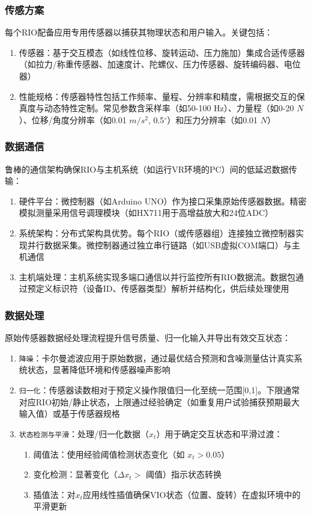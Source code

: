\documentclass[runningheads]{llncs}
\begin{document}
\subsubsection{传感方案}
每个RIO配备应用专用传感器以捕获其物理状态和用户输入。关键包括：
\begin{enumerate}
  \item 传感器：基于交互模态（如线性位移、旋转运动、压力施加）集成合适传感器（如拉力/称重传感器、加速度计、陀螺仪、压力传感器、旋转编码器、电位器）
  \item 性能规格：传感器特性包括工作频率、量程、分辨率和精度，需根据交互的保真度与动态特性定制。常见参数含采样率（如50-100 Hz）、力量程（如0-20 $N$）、位移/角度分辨率（如0.01 $m/s^2$, 0.5$^\circ$）和压力分辨率（如0.01 $N$）
\end{enumerate}

\subsubsection{数据通信}
鲁棒的通信架构确保RIO与主机系统（如运行VR环境的PC）间的低延迟数据传输：
\begin{enumerate}
  \item 硬件平台：微控制器（如Arduino UNO）作为接口采集原始传感器数据。精密模拟测量采用信号调理模块（如HX711用于高增益放大和24位ADC）
  \item 系统架构：分布式架构具优势。每个RIO（或传感器组）连接独立微控制器实现并行数据采集。微控制器通过独立串行链路（如USB虚拟COM端口）与主机通信
  \item 主机端处理：主机系统实现多端口通信以并行监控所有RIO数据流。数据包通过预定义标识符（设备ID、传感器类型）解析并结构化，供后续处理使用
\end{enumerate}

\subsubsection{数据处理}
原始传感器数据经处理流程提升信号质量、归一化输入并导出有效交互状态：
\begin{enumerate}
  \item \texttt{降噪}：卡尔曼滤波应用于原始数据，通过最优结合预测和含噪测量估计真实系统状态，显著降低环境和传感器噪声影响
  \item \texttt{归一化}：传感器读数相对于预定义操作限值归一化至统一范围[0,1]。下限通常对应RIO初始/静止状态，上限通过经验确定（如重复用户试验捕获预期最大输入值）或基于传感器规格
  \item \texttt{状态检测与平滑}：处理/归一化数据（$x_t$）用于确定交互状态和平滑过渡：
  \begin{enumerate}
    \item 阈值法：使用经验阈值检测状态变化（如 $x_t > 0.05$）
    \item 变化检测：显著变化（$\Delta x_t >$ 阈值）指示状态转换
    \item 插值法：对$x_t$应用线性插值确保VIO状态（位置、旋转）在虚拟环境中的平滑更新
  \end{enumerate}
\end{enumerate}
\end{document}
